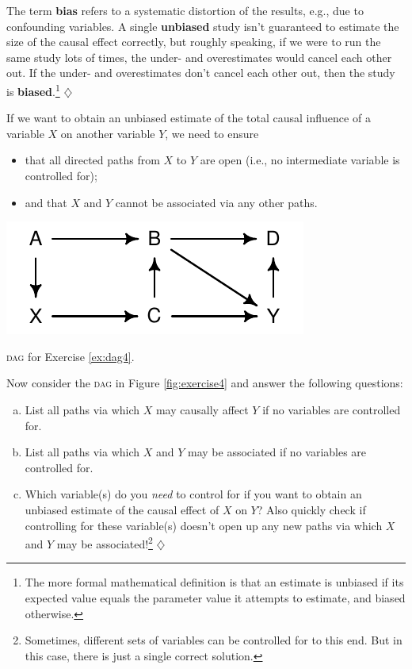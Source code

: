 \documentclass[a4paper]{tufte-book}\usepackage[]{graphicx}\usepackage[]{xcolor}
\newcommand{\term}[1]{\textbf{#1}}
\newcommand*{\parend}[1][$\diamondsuit$]{%
\leavevmode\unskip\penalty9999 \hbox{}\nobreak\hfill
    \quad\hbox{#1}%
}
\begin{document}
The term \term{bias} refers to a systematic distortion of the results, 
e.g., due to confounding variables. 
A single \term{unbiased} study isn't guaranteed to estimate the size of the causal effect correctly, 
but roughly speaking, 
if we were to run the same study lots of times, the under- and overestimates would cancel each other out. 
If the under- and overestimates don't cancel each other out, then the study is \term{biased}.\footnote{The more formal mathematical definition is that an estimate is unbiased
  if its expected value equals the parameter value it attempts to estimate,
  and biased otherwise.}
\parend

If\label{ex:dag4} we want to obtain an unbiased estimate of the total causal influence
  of a variable $X$ on another variable $Y$, we need to ensure \label{ex:dag}
  \begin{itemize}
    \item that all directed paths from $X$ to $Y$
          are open (i.e., no intermediate variable is controlled for);
    \item and that $X$ and $Y$ cannot be associated via any other paths.
  \end{itemize}
  
  \medskip
  
  
  \begin{marginfigure}
\includegraphics[width=\textwidth]{figure/exercise4}
\caption{\textsc{dag} for Exercise \ref{ex:dag4}.}
\label{fig:exercise4}
\end{marginfigure}

  Now consider the \textsc{dag} in Figure \ref{fig:exercise4} and
  answer the following questions:
  \begin{enumerate}[(a)]
    \item List all paths via which $X$ may causally affect $Y$ if no variables
    are controlled for.
    \item List all paths via which $X$ and $Y$ may be associated if no variables
    are controlled for.
    \item Which variable(s) do you \emph{need} to control for if
          you want to obtain an unbiased estimate of the causal
          effect of $X$ on $Y$?
          Also quickly check if controlling for these variable(s) doesn't open up any new paths via which $X$ and $Y$ may be associated!\footnote{Sometimes, different sets of variables can be controlled for to this end. But in this case, there is just a single correct solution.}
          \parend
  \end{enumerate}
\end{document}
